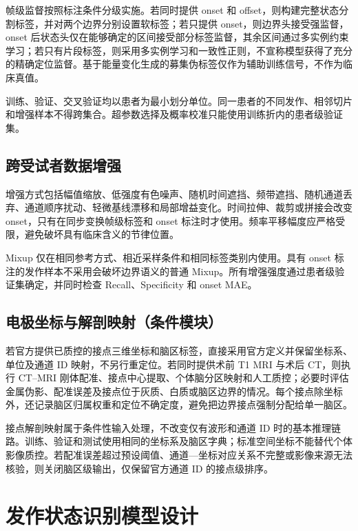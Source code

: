 \documentclass{cumcmthesis_v2}
\numberwithin{figure}{section} %
\numberwithin{table}{section} %
\begin{document}
帧级监督按照标注条件分级实施。若同时提供 onset 和 offset，则构建完整状态分割标签，并对两个边界分别设置软标签；若只提供 onset，则边界头接受强监督，onset 后状态头仅在能够确定的区间接受部分标签监督，其余区间通过多实例约束学习；若只有片段标签，则采用多实例学习和一致性正则，不宣称模型获得了充分的精确定位监督。基于能量变化生成的募集伪标签仅作为辅助训练信号，不作为临床真值。

训练、验证、交叉验证均以患者为最小划分单位。同一患者的不同发作、相邻切片和增强样本不得跨集合。超参数选择及概率校准只能使用训练折内的患者级验证集。

\subsection{跨受试者数据增强}

增强方式包括幅值缩放、低强度有色噪声、随机时间遮挡、频带遮挡、随机通道丢弃、通道顺序扰动、轻微基线漂移和局部增益变化。时间拉伸、裁剪或拼接会改变 onset，只有在同步变换帧级标签和 onset 标注时才使用。频率平移幅度应严格受限，避免破坏具有临床含义的节律位置。

Mixup 仅在相同参考方式、相近采样条件和相同标签类别内使用。具有 onset 标注的发作样本不采用会破坏边界语义的普通 Mixup。所有增强强度通过患者级验证集确定，并同时检查 Recall、Specificity 和 onset MAE。

\subsection{电极坐标与解剖映射（条件模块）}

若官方提供已质控的接点三维坐标和脑区标签，直接采用官方定义并保留坐标系、单位及通道 ID 映射，不另行重定位。若同时提供术前 T1 MRI 与术后 CT，则执行 CT–MRI 刚体配准、接点中心提取、个体脑分区映射和人工质控；必要时评估金属伪影、配准误差及接点位于灰质、白质或脑区边界的情况。每个接点除坐标外，还记录脑区归属权重和定位不确定度，避免把边界接点强制分配给单一脑区。

接点解剖映射属于条件性输入处理，不改变仅有波形和通道 ID 时的基本推理链路。训练、验证和测试使用相同的坐标系及脑区字典；标准空间坐标不能替代个体影像质控。若配准误差超过预设阈值、通道—坐标对应关系不完整或影像来源无法核验，则关闭脑区级输出，仅保留官方通道 ID 的接点级排序。


\clearpage

\section{发作状态识别模型设计}
\end{document}
